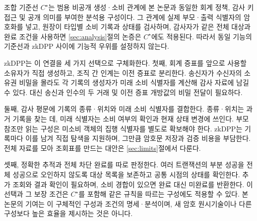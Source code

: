 조합 기준선 $C^\star$는 범용 비공개 생성·소비 관계에 본 논문과
동일한 회계 정책, 감사 키 접근 및 공개 의미를 부여한 분석용
구성이다. 그 관계에 실제 부모·출력 식별자의 암호화를 넣고,
원장이 타입별 소비 기록과 상태를 검사하며, 감사자가 같은 전체
대상과 완료 조건을 사용하면 \ref{sec:analysis}절의 논증은
$C^\star$에도 적용된다. 따라서 동일 기능의 기준선과 zkDPP 사이에
기능적 우위를 설정하지 않는다.

zkDPP는 이 연결을 세 가지 선택으로 구체화한다.
첫째, 회계 증표를 앞으로 사용할 소유자가 직접 생성하고,
조직 간 인계는 이전 증표로 분리한다. 송신자가 수신자의 소유권
비밀을 몰라도 각 기록의 생성자가 미래 소비 식별자를 계산해
감사 자료에 남길 수 있다. 대신 송신과 인수의 두 거래 및
이전 증표 개방값의 비밀 전달이 필요하다.

둘째, 감사 평문에 기록의 종류·위치와 미래 소비 식별자를 결합한다.
종류·위치는 과거 기록을 찾는 데, 미래 식별자는 소비 여부의 확인과
현재 상태 변경에 쓰인다. 부모 참조만 읽는 구성은 미소비 객체의
집행 식별자를 별도로 확보해야 한다. zkDPP는 기록마다 이를 남겨
직접 탐색을 지원하며, 그만큼 암호문 저장과 검증 비용을 부담한다.
전체 자료를 모아 조회표를 만드는 대안은 \ref{sec:limits}절에서 다룬다.

셋째, 정확한 추적과 전체 차단 완료를 따로 판정한다.
여러 트랜잭션의 부분 성공을 전체 성공으로 오인하지 않도록
대상 목록을 보존하고 공통 시점의 상태를 확인한다.
추가 조회와 결과 확인이 필요하며, 소비 경합이 있으면 완료 대신
미완료를 반환한다. 이 선택과 그 보장 조건은
$C^\star$를 포함해 같은 규칙을 따르는 구성에도 적용할 수 있다.
본 논문의 기여는 이 구체적인 구성과 조건의 명세·분석이며,
새 암호 원시기술이나 다른 구성보다 높은 효율을 제시하는 것은 아니다.
